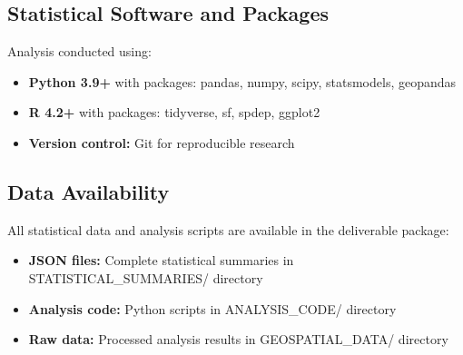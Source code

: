 \documentclass[11pt,letterpaper]{article}
\begin{document}
\subsection{Statistical Software and Packages}

Analysis conducted using:
\begin{itemize}
    \item \textbf{Python 3.9+} with packages: pandas, numpy, scipy, statsmodels, geopandas
    \item \textbf{R 4.2+} with packages: tidyverse, sf, spdep, ggplot2
    \item \textbf{Version control:} Git for reproducible research
\end{itemize}

\subsection{Data Availability}

All statistical data and analysis scripts are available in the deliverable package:
\begin{itemize}
    \item \textbf{JSON files:} Complete statistical summaries in STATISTICAL\_SUMMARIES/ directory
    \item \textbf{Analysis code:} Python scripts in ANALYSIS\_CODE/ directory
    \item \textbf{Raw data:} Processed analysis results in GEOSPATIAL\_DATA/ directory
\end{itemize}
\end{document}
